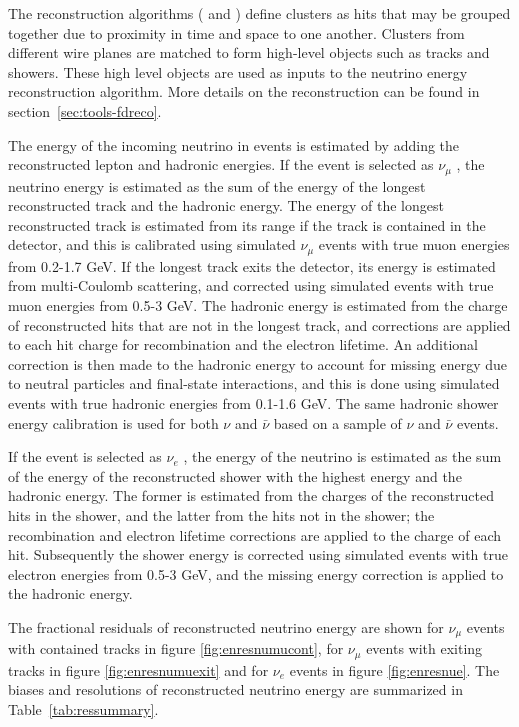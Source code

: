 The reconstruction algorithms ( and ) define clusters as hits that may be grouped together due to proximity in time and space to one another. Clusters from different wire planes are matched to form high-level objects such as tracks and showers. These high level objects are used as inputs to the neutrino energy reconstruction algorithm. More details on the reconstruction can be found in section~\ref{sec:tools-fdreco}.


The energy of the incoming neutrino in  events is estimated by adding the reconstructed lepton and hadronic energies. 
If the event is selected as $\nu_{\mu}$ , the neutrino energy is estimated as the sum of the energy of the longest reconstructed track and the hadronic energy. The energy of the longest reconstructed track is estimated from its range if the track is contained in the detector, and this is calibrated using simulated $\nu_{\mu}$  events with true muon energies from 0.2-1.7 GeV. If the longest track exits the detector, its energy is estimated from multi-Coulomb scattering, and corrected using simulated events with true muon energies from 0.5-3 GeV. The hadronic energy is estimated from the charge of reconstructed hits that are not in the longest track, and corrections are applied to each hit charge for recombination and the electron lifetime. An additional correction is then made to the hadronic energy to account for missing energy due to neutral particles and final-state interactions, and this is done using simulated events with true hadronic energies from 0.1-1.6 GeV. The same hadronic shower energy calibration is used for both $\nu$ and $\bar{\nu}$ based on a sample of $\nu$ and $\bar{\nu}$ events.

If the event is selected as $\nu_{e}$ , the energy of the 
neutrino is estimated as the sum of the energy of the reconstructed shower with the highest energy and the hadronic energy. The former is estimated from the charges of the reconstructed hits in the shower, and the latter from the hits not in the shower; the recombination and electron lifetime corrections are applied to the charge of each hit. Subsequently the shower energy is corrected using simulated events with true electron energies from 0.5-3 GeV, and the missing energy correction is applied to the hadronic energy.

The fractional residuals of reconstructed neutrino energy are shown for $\nu_{\mu}$  events with contained tracks in figure \ref{fig:enresnumucont}, for $\nu_{\mu}$  events with exiting tracks in figure \ref{fig:enresnumuexit} and for $\nu_{e}$  events in figure \ref{fig:enresnue}. The biases and resolutions of reconstructed neutrino energy are summarized in Table~\ref{tab:ressummary}.

